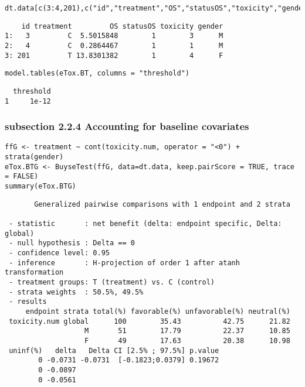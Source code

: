 \documentclass[12pt]{article}
\begin{document}
\lstset{language=r,label= ,caption= ,captionpos=b,numbers=none}
\begin{lstlisting}
dt.data[c(3:4,201),c("id","treatment","OS","statusOS","toxicity","gender")]
\end{lstlisting}

\begin{verbatim}
    id treatment         OS statusOS toxicity gender
1:   3         C  5.5015848        1        3      M
2:   4         C  0.2864467        1        1      M
3: 201         T 13.8301382        1        4      F
\end{verbatim}


\lstset{language=r,label= ,caption= ,captionpos=b,numbers=none}
\begin{lstlisting}
model.tables(eTox.BT, columns = "threshold")
\end{lstlisting}

\begin{verbatim}
  threshold
1     1e-12
\end{verbatim}

\subsubsection{subsection 2.2.4 Accounting for baseline covariates}
\label{sec:orge242701}

\lstset{language=r,label= ,caption= ,captionpos=b,numbers=none}
\begin{lstlisting}
ffG <- treatment ~ cont(toxicity.num, operator = "<0") + strata(gender)
eTox.BTG <- BuyseTest(ffG, data=dt.data, keep.pairScore = TRUE, trace = FALSE)
summary(eTox.BTG)
\end{lstlisting}

\begin{verbatim}
       Generalized pairwise comparisons with 1 endpoint and 2 strata

 - statistic       : net benefit (delta: endpoint specific, Delta: global) 
 - null hypothesis : Delta == 0 
 - confidence level: 0.95 
 - inference       : H-projection of order 1 after atanh transformation 
 - treatment groups: T (treatment) vs. C (control) 
 - strata weights  : 50.5%, 49.5% 
 - results
     endpoint strata total(%) favorable(%) unfavorable(%) neutral(%)
 toxicity.num global      100        35.43          42.75      21.82
                   M       51        17.79          22.37      10.85
                   F       49        17.63          20.38      10.98
 uninf(%)   delta   Delta CI [2.5% ; 97.5%] p.value 
        0 -0.0731 -0.0731  [-0.1823;0.0379] 0.19672 
        0 -0.0897                                   
        0 -0.0561
\end{verbatim}
\end{document}
